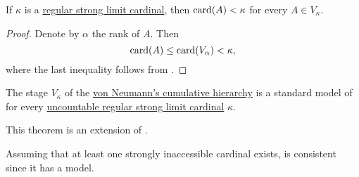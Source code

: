 \begin{corollary}\label{thm:strong_regular_cardinal_stage_cardinality}
  If \( \kappa \) is a \hyperref[rem:strongly_inaccessible_cardinal]{regular strong limit cardinal}, then \( \operatorname{card}(A) < \kappa \) for every \( A \in V_\kappa \).
\end{corollary}
\begin{proof}
  Denote by \( \alpha \) the rank of \( A \). Then
  \begin{equation*}
    \operatorname{card}(A) \leq \operatorname{card}(V_\alpha) < \kappa,
  \end{equation*}
  where the last inequality follows from .
\end{proof}

\begin{theorem}\label{thm:cumulative_hierarchy_model_of_zfc}
  The stage \( V_\kappa \) of the \hyperref[def:cumulative_hierarchy]{von Neumann's cumulative hierarchy} is a standard model of  for every \hyperref[rem:strongly_inaccessible_cardinal]{uncountable regular strong limit cardinal} \( \kappa \).
\end{theorem}
\begin{comments}
  \item This theorem is an extension of .
  \item Assuming that at least one strongly inaccessible cardinal exists,  is consistent since it has a model.
\end{comments}
